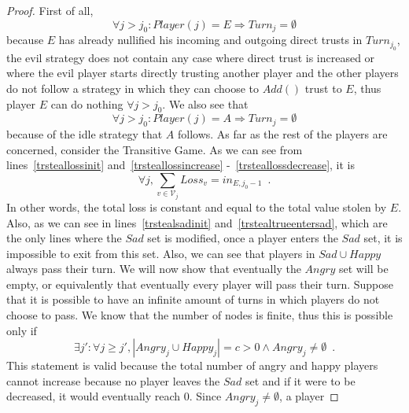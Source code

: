 \documentclass[11pt]{llncs}
\begin{document}
    \begin{proof}
       First of all,
       \begin{equation}
          \forall j > j_0 : Player\left(j\right) = E \Rightarrow Turn_j = \emptyset
       \end{equation}
        because $E$ has already nullified his incoming and outgoing direct trusts in $Turn_{j_0}$, the evil strategy does not
       contain any case where direct trust is increased or where the evil player starts directly trusting another player and
       the other players do not follow a strategy in which they can choose to $Add\left(\right)$ trust to $E$, thus player
       $E$ can do nothing $\forall j > j_0$. We also see that
       \begin{equation}
          \forall j > j_0 : Player(j) = A \Rightarrow Turn_j = \emptyset
       \end{equation}
       because of the idle strategy that $A$ follows. As far as the rest of the players are concerned, consider the
       Transitive Game. As we can see from lines~\ref{trsteallossinit} and~\ref{trsteallossincrease}
       -~\ref{trsteallossdecrease}, it is
       \begin{equation}
          \forall j, \sum\limits_{v \in \mathcal{V}_j}Loss_v = in_{E, j_0-1} \enspace.
       \end{equation}
       In other words, the total loss is constant and equal to the total value stolen by $E$. Also, as we can see in
       lines~\ref{trstealsadinit} and~\ref{trstealtrueentersad}, which are the only lines where the $Sad$ set is modified,
       once a player enters the $Sad$ set, it is impossible to exit from this set. Also, we can see that players in $Sad
       \cup Happy$ always pass their turn. We will now show that eventually the $Angry$ set will be empty, or equivalently
       that eventually every player will pass their turn. Suppose that it is possible to have an infinite amount of turns
       in which players do not choose to pass. We know that the number of nodes is finite, thus this is possible only if
       \begin{equation}
          \exists j': \forall j \geq j', |Angry_j \cup Happy_j| = c > 0 \wedge Angry_j \neq \emptyset \enspace.
       \end{equation}
       This statement is valid because the total number of angry and happy players cannot increase because no player leaves
       the $Sad$ set and if it were to be decreased, it would eventually reach 0. Since $Angry_j \neq \emptyset$, a player

\end{proof}
\end{document}
